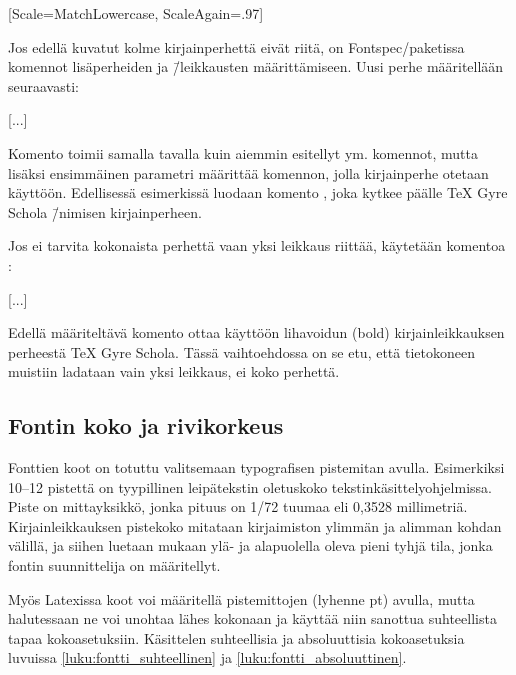 \begin{koodilohkosis}
  \setmonofont{TeX Gyre Cursor}
  [Scale=MatchLowercase, ScaleAgain=.97]
\end{koodilohkosis}

Jos edellä kuvatut kolme kirjainperhettä eivät riitä, on
Fontspec\-/paketissa komennot lisäperheiden ja \=/leikkausten
määrittämiseen. Uusi perhe määritellään seuraavasti:

\begin{koodilohkosis}
  [...]
\end{koodilohkosis}

Komento  toimii samalla tavalla kuin aiemmin
esitellyt  ym. komennot, mutta lisäksi
ensimmäinen parametri määrittää komennon, jolla kirjainperhe otetaan
käyttöön. Edellisessä esimerkissä luodaan komento , joka kytkee päälle TeX Gyre Scho\-la \=/nimisen
kirjainperheen.
          
Jos ei tarvita kokonaista perhettä vaan yksi leikkaus riittää, käytetään
komentoa :

\begin{koodilohkosis}
  [...]
\end{koodilohkosis}

Edellä määriteltävä komento  ottaa käyttöön
lihavoidun (bold) kirjainleikkauksen perheestä TeX Gyre Scho\-la. Tässä
vaih\-to\-eh\-dos\-sa on se etu, että tietokoneen muistiin ladataan vain
yksi leikkaus, ei koko perhettä.

\subsection{Fontin koko ja rivikorkeus}

Fonttien koot on totuttu valitsemaan typografisen pistemitan avulla.
Esimerkiksi 10--12 pistettä on tyypillinen leipätekstin oletuskoko
teks\-tin\-kä\-sit\-tely\-ohjel\-mis\-sa. Piste on mitta\-yksikkö, jonka
pituus on 1/72 tuumaa eli 0,3528 millimetriä. Kirjainleikkauksen
pistekoko mitataan kirjaimiston ylimmän ja alimman kohdan välillä, ja
siihen luetaan mukaan ylä- ja alapuolella oleva pieni tyhjä tila, jonka
fontin suunnittelija on määritellyt.

Myös Latexissa koot voi määritellä pistemittojen (lyhenne pt) avulla,
mutta halutessaan ne voi unohtaa lähes kokonaan ja käyttää niin sanottua
suhteellista tapaa koko\-asetuksiin. Käsittelen suhteellisia ja
absoluuttisia koko\-ase\-tuk\-sia luvuissa
\ref{luku:fontti_suhteellinen} ja \ref{luku:fontti_absoluuttinen}.

